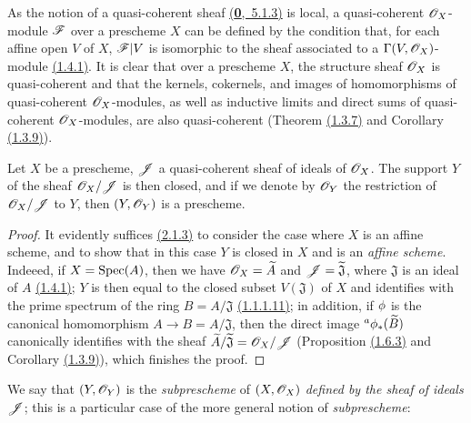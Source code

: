 \begin{env}[4.1.1]
\label{env-1.4.1.1}
As the notion of a quasi-coherent sheaf \hyperref[env-0.5.1.3]{(\textbf{0},~5.1.3)} is local,
a quasi-coherent $\mathscr{O}_X$-module $\mathscr{F}$ over a prescheme $X$ can be defined by the condition
that, for each affine open $V$ of $X$, $\mathscr{F}|V$ is isomorphic to the sheaf associated to a
$\Gamma(V,\mathscr{O}_X)$-module \hyperref[thm-1.1.4.1]{(1.4.1)}. It is clear that over a prescheme
$X$, the structure sheaf $\mathscr{O}_X$ is quasi-coherent and that the kernels, cokernels, and
images of homomorphisms of quasi-coherent $\mathscr{O}_X$-modules, as well as inductive limits and
direct sums of quasi-coherent $\mathscr{O}_X$-modules, are also quasi-coherent
(Theorem \hyperref[thm-1.1.3.7]{(1.3.7)} and Corollary \hyperref[cor-1.1.3.9]{(1.3.9)}).
\end{env}

\begin{prop}[4.1.2]
\label{prop-1.4.1.2}
Let $X$ be a prescheme, $\mathscr{J}$ a quasi-coherent sheaf of ideals of $\mathscr{O}_X$. The support
$Y$ of the sheaf $\mathscr{O}_X/\mathscr{J}$ is then closed, and if we denote by $\mathscr{O}_Y$ the restriction
of $\mathscr{O}_X/\mathscr{J}$ to $Y$, then $(Y,\mathscr{O}_Y)$ is a prescheme.
\end{prop}

\begin{proof}
\label{proof-prop-1.4.1.2}
It evidently suffices \hyperref[prop-1.2.1.3]{(2.1.3)} to consider the case where $X$ is an
affine scheme, and to show that in this case $Y$ is closed in $X$ and is an {\it affine
scheme}. Indeeed, if $X={\mathop{\mathrm{Spec}}\nolimits}(A)$, then we have $\mathscr{O}_X=\widetilde{A}$ and
$\mathscr{J}=\widetilde{\mathfrak{J}}$, where $\mathfrak{J}$ is an ideal of $A$
\hyperref[thm-1.1.4.1]{(1.4.1)}; $Y$ is then equal to the closed subset $V(\mathfrak{J})$ of
$X$ and identifies with the prime spectrum of the ring $B=A/\mathfrak{J}$
\hyperref[prop-1.1.1.11]{(1.1.1.11)}; in addition, if $\phi$ is the canonical
homomorphism $A\to B=A/\mathfrak{J}$, then the direct image ${}^a\phi_*(\widetilde{B})$
canonically identifies with the sheaf $\widetilde{A}/\widetilde{\mathfrak{J}}=\mathscr{O}_X/\mathscr{J}$
(Proposition \hyperref[prop-1.1.6.3]{(1.6.3)} and Corollary \hyperref[cor-1.1.3.9]{(1.3.9)}),
which finishes the proof.
\end{proof}

We say that $(Y,\mathscr{O}_Y)$ is the {\it subprescheme} of $(X,\mathscr{O}_X)$ {\it defined by the
sheaf of ideals $\mathscr{J}$}; this is a particular case of the more general notion of
{\it subprescheme}:

